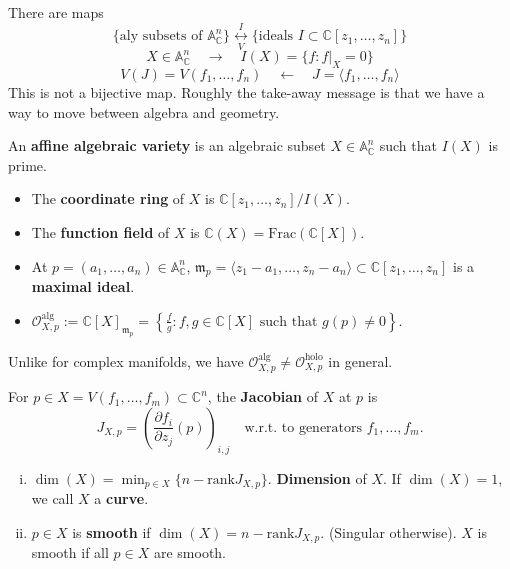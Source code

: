 \documentclass{article}
\begin{document}
There are maps
$$
\{ \text{aly subsets of } \mathbb{A}_{\mathbb{C}}^n \} \underset{V}{\overset{I}{\longleftrightarrow}} \{ \text{ideals } I \subset \mathbb{C}[z_1, \ldots, z_n] \}
$$
$$
X \in \mathbb{A}_{\mathbb{C}}^n \quad \longrightarrow \quad I(X) = \{ f : f|_X = 0 \}
$$
$$
V(J) = V(f_1, \ldots, f_n) \quad \longleftarrow \quad J = \langle f_1, \ldots, f_n \rangle
$$
This is not a bijective map. Roughly the take-away message is that we have a way to move between algebra and geometry.

\begin{definition}
An \textbf{affine algebraic variety} is an algebraic subset $X \in \mathbb{A}_{\mathbb{C}}^n$ such that $I(X)$ is prime.
\begin{itemize}
    \item The \textbf{coordinate ring} of $X$ is $\mathbb{C}[z_1, \ldots, z_n] / I(X)$.
    \item The \textbf{function field} of $X$ is $\mathbb{C}(X) = \text{Frac} (\mathbb{C}[X])$.
    \item At $p = (a_1, \ldots, a_n) \in \mathbb{A}_{\mathbb{C}}^n$, $\mathfrak{m}_p = \langle z_1 - a_1, \ldots, z_n - a_n \rangle \subset \mathbb{C}[z_1, \ldots, z_n]$ is a \textbf{maximal ideal}.
    \item $\mathcal{O}_{X, p}^{\text{alg}} := \mathbb{C}[X]_{\mathfrak{m}_p} = \left\{ \frac{f}{g} : f, g \in \mathbb{C}[X] \text{ such that } g(p) \ne 0 \right\}$.
\end{itemize}
Unlike for complex manifolds, we have $\mathcal{O}_{X, p}^{\text{alg}} \ne \mathcal{O}_{X, p}^{\text{holo}}$ in general.
\end{definition}

\begin{definition}
For $p \in X = V(f_1, \ldots, f_m) \subset \mathbb{C}^n$, the \textbf{Jacobian} of $X$ at $p$ is
$$
J_{X, p} = \left( \frac{\partial f_i}{\partial z_j} (p) \right)_{i, j} \quad \text{w.r.t. to generators } f_1, \ldots, f_m.
$$
\begin{enumerate}[(i)]
    \item $\dim(X) = \min_{p \in X} \{ n - \text{rank} J_{X, p} \}$. \textbf{Dimension} of $X$.
    If $\dim(X) = 1$, we call $X$ a \textbf{curve}.
    \item $p \in X$ is \textbf{smooth} if $\dim(X) = n - \text{rank} J_{X, p}$.
    (Singular otherwise). $X$ is smooth if all $p \in X$ are smooth.
\end{enumerate}
\end{definition}
\end{document}
